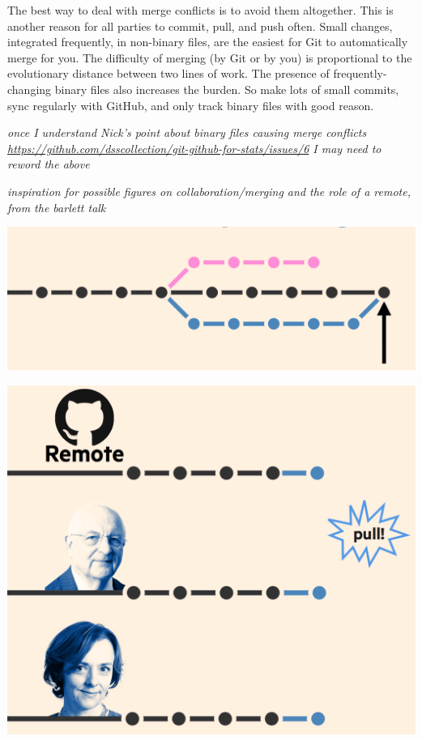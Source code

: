 \documentclass[12pt]{article}
\begin{document}
The best way to deal with merge conflicts is to avoid them altogether.
This is another reason for all parties to commit, pull, and push often.
Small changes, integrated frequently, in non-binary files, are the
easiest for Git to automatically merge for you. The difficulty of
merging (by Git or by you) is proportional to the evolutionary distance
between two lines of work. The presence of frequently-changing binary
files also increases the burden. So make lots of small commits, sync
regularly with GitHub, and only track binary files with good reason.

\emph{once I understand Nick's point about binary files causing merge
conflicts
\url{https://github.com/dsscollection/git-github-for-stats/issues/6} I
may need to reword the above}

\emph{inspiration for possible figures on collaboration/merging and the
role of a remote, from the barlett talk}

\includegraphics[width=1\linewidth]{bartlett-merge-commit}

\includegraphics[width=1\linewidth]{bartlett-pull}
\end{document}
